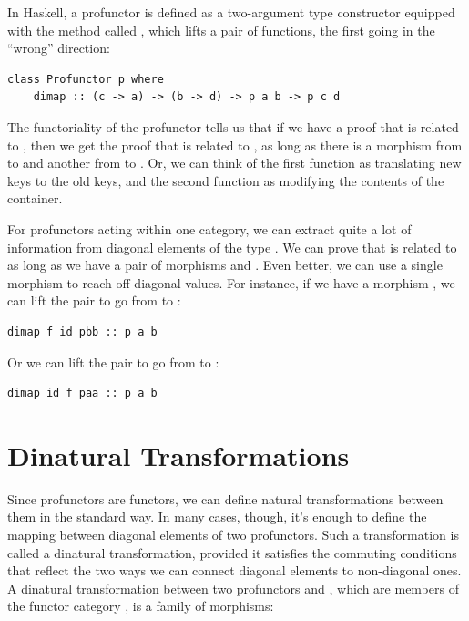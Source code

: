In Haskell, a profunctor is defined as a two-argument type constructor
 equipped with the method called , which lifts a
pair of functions, the first going in the ``wrong'' direction:

\begin{Verbatim}[commandchars=\\\{\}]
class Profunctor p where
    dimap :: (c -> a) -> (b -> d) -> p a b -> p c d
\end{Verbatim}
The functoriality of the profunctor tells us that if we have a proof
that  is related to , then we get the proof that
 is related to , as long as there is a morphism from
 to  and another from  to . Or,
we can think of the first function as translating new keys to the old
keys, and the second function as modifying the contents of the
container.

For profunctors acting within one category, we can extract quite a lot
of information from diagonal elements of the type . We
can prove that  is related to  as long as we have a
pair of morphisms  and
. Even better, we can use a single morphism to
reach off-diagonal values. For instance, if we have a morphism
, we can lift the pair
 to go from  to
:

\begin{Verbatim}[commandchars=\\\{\}]
dimap f id pbb :: p a b
\end{Verbatim}
Or we can lift the pair  to go
from  to :

\begin{Verbatim}[commandchars=\\\{\}]
dimap id f paa :: p a b
\end{Verbatim}

\section{Dinatural Transformations}\label{dinatural-transformations}

Since profunctors are functors, we can define natural transformations
between them in the standard way. In many cases, though, it's enough to
define the mapping between diagonal elements of two profunctors. Such a
transformation is called a dinatural transformation, provided it
satisfies the commuting conditions that reflect the two ways we can
connect diagonal elements to non-diagonal ones. A dinatural
transformation between two profunctors  and , which
are members of the functor category , is a
family of morphisms:

